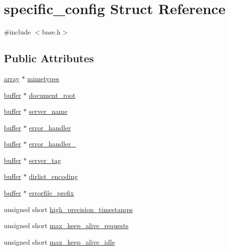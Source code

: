 \hypertarget{structspecific__config}{\section{specific\-\_\-config Struct Reference}
\label{structspecific__config}
}


{\ttfamily \#include $<$base.\-h$>$}

\subsection*{Public Attributes}
\begin{DoxyCompactItemize}
\item 
\hyperlink{structarray}{array} $\ast$ \hyperlink{structspecific__config_af95ed73a2b67582fced117bcdc826348}{mimetypes}
\item 
\hyperlink{structbuffer}{buffer} $\ast$ \hyperlink{structspecific__config_adce38ac3a259651eea450f7aba2b1b8d}{document\-\_\-root}
\item 
\hyperlink{structbuffer}{buffer} $\ast$ \hyperlink{structspecific__config_a6383e0621886e13fe6cf603cd22f9f84}{server\-\_\-name}
\item 
\hyperlink{structbuffer}{buffer} $\ast$ \hyperlink{structspecific__config_aaa57502eab1aab0856f2f540218a9893}{error\-\_\-handler}
\item 
\hyperlink{structbuffer}{buffer} $\ast$ \hyperlink{structspecific__config_a0fdc9709ac55069fd6303ab22bcfb5a6}{error\-\_\-handler\-\_}
\item 
\hyperlink{structbuffer}{buffer} $\ast$ \hyperlink{structspecific__config_a008031c9dbac28f6ffa84809857a53e5}{server\-\_\-tag}
\item 
\hyperlink{structbuffer}{buffer} $\ast$ \hyperlink{structspecific__config_ab4f64099f9a1bad5f3e327b0cde06729}{dirlist\-\_\-encoding}
\item 
\hyperlink{structbuffer}{buffer} $\ast$ \hyperlink{structspecific__config_ae6fb00722597cdbcb3a01c29eacf2f43}{errorfile\-\_\-prefix}
\item 
unsigned short \hyperlink{structspecific__config_a9022a8482243c77301bdb64249951eed}{high\-\_\-precision\-\_\-timestamps}
\item 
unsigned short \hyperlink{structspecific__config_a5561ac45357a155b2fc4480dc664398f}{max\-\_\-keep\-\_\-alive\-\_\-requests}
\item 
unsigned short \hyperlink{structspecific__config_a0648ebac1a3dab4d171b15692bbe7394}{max\-\_\-keep\-\_\-alive\-\_\-idle}

\end{DoxyCompactItemize}
